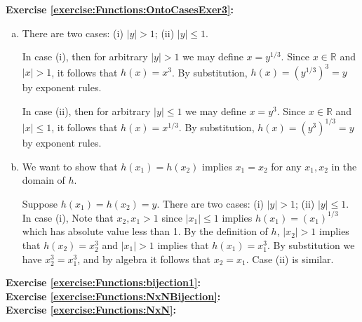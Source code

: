 \noindent\textbf{Exercise \ref{exercise:Functions:OntoCasesExer3}:} %
\begin{enumerate}[(a)]
\item
There are two cases: (i) $|y|>1$; (ii) $|y|\le 1$.  

In case (i), then for arbitrary $|y|>1$ we may define $x = y^{1/3}$.  Since $x \in \mathbb{R}$ and $|x|>1$, it follows that $h(x) = x^3 $. By substitution, $h(x) = (y^{1/3})^3 = y$ by exponent rules. 

In case (ii), then for arbitrary $|y|\le1$ we may define $x = y^3$.  Since $x \in \mathbb{R}$ and $|x|\le 1$, it follows that $h(x) = x^{1/3} $. By substitution, $h(x) = (y^{3})^{1/3} = y$ by exponent rules.
\item
We want to show that $h(x_1)=h(x_2)$ implies $x_1=x_2$ for any $x_1,x_2$ in the domain of $h$.

Suppose $h(x_1)=h(x_2)=y$. There are two cases: (i) $|y|>1$; (ii) $|y|\le 1$. In case (i), Note that $x_2,x_1 >1$ since $|x_1| \le1$ implies $h(x_1) = (x_1)^{1/3}$ which has absolute value less than 1. By the definition of $h$, $|x_2| > 1$ implies that $h(x_2) = x_2^3$ and $|x_1| > 1$ implies that $h(x_1) = x_1^3$. By substitution we have $x_2^3 = x_1^3$, and by algebra it follows that $x_2=x_1$. Case (ii) is similar. 
\end{enumerate}


\noindent\textbf{Exercise \ref{exercise:Functions:bijection1}:}\\

\noindent\textbf{Exercise \ref{exercise:Functions:NxNBijection}:}\\

\noindent\textbf{Exercise \ref{exercise:Functions:NxN}:}\\

